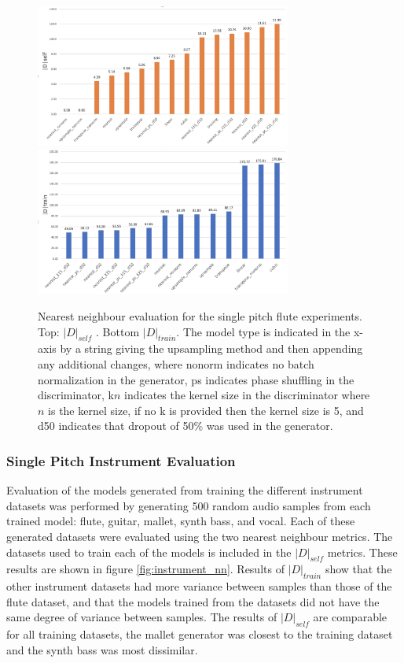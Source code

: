 \begin{figure}[htbp]
\centering
\includegraphics[width=0.75\textwidth]{D_self.png}
\includegraphics[width=0.75\textwidth]{D_train.png}
\caption{Nearest neighbour evaluation for the single pitch flute experiments. Top: $|D|_{self}$ . Bottom $|D|_{train}$. The model type is indicated in the x-axis by a string giving the upsampling method and then appending any additional changes, where nonorm indicates no batch normalization in the generator, ps indicates phase shuffling in the discriminator, k$n$ indicates the kernel size in the discriminator where $n$ is the kernel size, if no k is provided then the kernel size is 5, and d50 indicates that dropout of 50\% was used in the generator.}
\label{fig:single_pitch_nn}
\end{figure}

\subsubsection{Single Pitch Instrument Evaluation}
Evaluation of the models generated from training the different instrument datasets was performed by generating 500 random audio samples from each trained model: flute, guitar, mallet, synth bass, and vocal. Each of these generated datasets were evaluated using the two nearest neighbour metrics. The datasets used to train each of the models is included in the $|D|_{self}$ metrics. These results are shown in figure \ref{fig:instrument_nn}. Results of $|D|_{train}$ show that the other instrument datasets had more variance between samples than those of the flute dataset, and that the models trained from the datasets did not have the same degree of variance between samples. The results of $|D|_{self}$ are comparable for all training datasets, the mallet generator was closest to the training dataset and the synth bass was most dissimilar.

